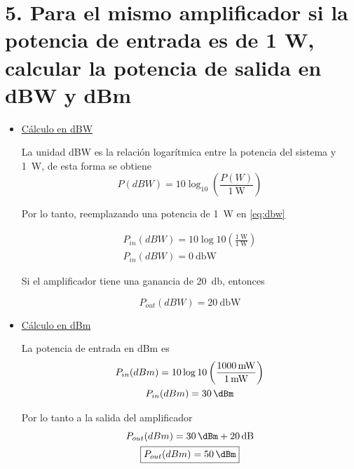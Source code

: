 \documentclass[11pt,a4paper]{article}
\begin{document}
\section*{5. Para el mismo amplificador si la potencia de entrada es de 1 W, calcular la
potencia de salida en dBW y dBm}
\begin{itemize}
    \item \underline{Cálculo en dBW}

        \vspace{2mm}
La unidad dBW es la relación logarítmica entre la potencia del sistema y \SI{1}{\watt},
de esta forma se obtiene
\begin{equation}
    P(dBW) = 10 \log_{10} \left(\frac{P(W)}{\SI{1}{\watt}}\right)
    \label{eq:dbw}
\end{equation}

Por lo tanto, reemplazando una potencia de \SI{1}{\watt} en \eqref{eq:dbw}

\[
    \begin{gathered}
        P_{in}(dBW) = 10 \log{10} \left(\frac{\SI{1}{\watt}}{\SI{1}{\watt}}\right) \\
        P_{in}(dBW) = \SI{0}{\decibel\watt}
    \end{gathered}
\]

Si el amplificador tiene una ganancia de \SI{20}{\decibel}, entonces

\[
    \boxed{P_{out}(dBW) = \SI{20}{\decibel\watt}}
\]

\item \underline{Cálculo en dBm}

    \vspace{2mm}
    La potencia de entrada en dBm es
    \[
        \begin{gathered}
            P_{in}(dBm) = 10 \log{10} \left(\frac{\SI{1000}{\milli\watt}}{\SI{1}{\milli\watt}}\right) \\
            P_{in}(dBm) = \SI{30}{\dBm}
        \end{gathered}
    \]
    
    Por lo tanto a la salida del amplificador
    \[
        \begin{gathered}
            P_{out}(dBm) = \SI{30}{\dBm} + \SI{20}{\decibel} \\
            \boxed{P_{out}(dBm) = \SI{50}{\dBm}}
        \end{gathered}
    \]

\end{itemize}

\end{document}

